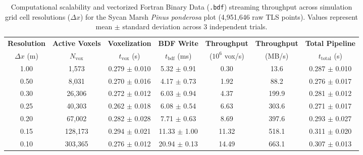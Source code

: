 \begin{table}[htbp]
\centering
\caption{Computational scalability and vectorized Fortran Binary Data (\texttt{.bdf}) streaming throughput across simulation grid cell resolutions ($\Delta x$) for the Sycan Marsh \textit{Pinus ponderosa} plot (4,951,646 raw TLS points). Values represent mean $\pm$ standard deviation across 3 independent trials.}
\label{tab:voxel_scaling}
\small
\begin{tabular}{ccccccc}
\toprule
\textbf{Resolution} & \textbf{Active Voxels} & \textbf{Voxelization} & \textbf{BDF Write} & \textbf{Throughput} & \textbf{Throughput} & \textbf{Total Pipeline} \\
$\Delta x$ (m) & $N_{\text{vox}}$ & $t_{\text{vox}}$ (s) & $t_{\text{bdf}}$ (ms) & ($10^6$ vox/s) & (MB/s) & $t_{\text{total}}$ (s) \\
\midrule
1.00 & 1,573 & 0.279 $\pm$ 0.010 & 5.32 $\pm$ 0.91 & 0.30 & 13.6 & 0.287 $\pm$ 0.010 \\
0.50 & 8,031 & 0.270 $\pm$ 0.016 & 4.17 $\pm$ 0.73 & 1.92 & 88.2 & 0.276 $\pm$ 0.017 \\
0.30 & 26,306 & 0.272 $\pm$ 0.012 & 6.03 $\pm$ 0.94 & 4.37 & 199.9 & 0.281 $\pm$ 0.012 \\
0.25 & 40,303 & 0.262 $\pm$ 0.018 & 6.08 $\pm$ 0.54 & 6.63 & 303.6 & 0.271 $\pm$ 0.017 \\
0.20 & 67,002 & 0.282 $\pm$ 0.028 & 7.71 $\pm$ 0.63 & 8.69 & 397.6 & 0.293 $\pm$ 0.027 \\
0.15 & 128,173 & 0.294 $\pm$ 0.021 & 11.33 $\pm$ 1.00 & 11.32 & 518.1 & 0.311 $\pm$ 0.020 \\
0.10 & 303,365 & 0.276 $\pm$ 0.012 & 20.94 $\pm$ 0.13 & 14.49 & 663.1 & 0.307 $\pm$ 0.013 \\
\bottomrule
\end{tabular}
\end{table}
